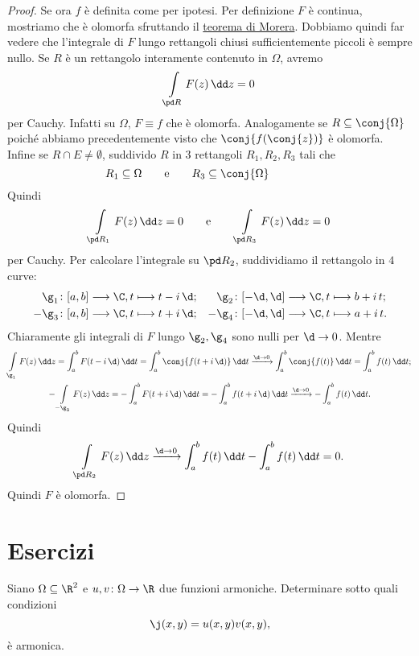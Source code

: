 \begin{proof}
	Se ora \(f\) è definita come per ipotesi. Per definizione \(F\) è continua, mostriamo che è olomorfa sfruttando il \hyperref[th:teoremaMorera]{teorema di Morera}. Dobbiamo quindi far vedere che l'integrale di \(F\) lungo rettangoli chiusi sufficientemente piccoli è sempre nullo.
	Se \(R\) è un rettangolo interamente contenuto in \(\Omega\), avremo
	\[
		\int\limits_{\pd R}F(z)\,\dd z = 0
	\]
	per Cauchy. Infatti su \(\Omega\), \(F\equiv f\) che è olomorfa.
	Analogamente se \(R\subseteq\conj{\Omega}\) poiché abbiamo precedentemente visto che \(\conj{f(\conj{z})}\) è olomorfa.
	Infine se \(R\cap E\neq \emptyset\), suddivido \(R\) in \(3\) rettangoli \(R_1,R_2,R_3\) tali che
	\[
		R_1 \subseteq \Omega \qquad\text{e}\qquad R_3 \subseteq \conj{\Omega} \qquad\qquad 
	\]
	Quindi
	\[
		\int\limits_{\pd R_1}F(z)\,\dd z = 0 \qquad\text{e}\qquad \int\limits_{\pd R_3}F(z)\,\dd z = 0
	\]
	per Cauchy. Per calcolare l'integrale su \(\pd R_2\), suddividiamo il rettangolo in \(4\) curve:
	\begin{align*}
		\g_1\colon [a,b] \longrightarrow \C  & , t\longmapsto t-i\,\d; & \g_2\colon [-\d,\d] \longrightarrow \C  & , t\longmapsto b+i\,t;  \\
		-\g_3\colon [a,b] \longrightarrow \C & , t\longmapsto t+i\,\d; & -\g_4\colon [-\d,\d] \longrightarrow \C & , t\longmapsto a+i\,t.
	\end{align*}
	Chiaramente gli integrali di \(F\) lungo \(\g_2,\g_4\) sono nulli per \(\d \to 0\). Mentre
	\begin{gather*}
		\int\limits_{\g_1}F(z)\,\dd z = \int_a^b F(t-i\,\d)\,\dd t = \int_a^b \conj{f(t+i\,\d)}\,\dd t \xrightarrow{\d \to 0} \int_a^b \conj{f(t)}\,\dd t = \int_a^b f(t)\,\dd t;\\
		-\int\limits_{-\g_3}F(z)\,\dd z = -\int_a^b F(t+i\,\d)\,\dd t = -\int_a^b f(t+i\,\d)\,\dd t \xrightarrow{\d \to 0} -\int_a^b f(t)\,\dd t.
	\end{gather*}
	Quindi
	\[
		\int\limits_{\pd R_2}F(z)\,\dd z \xrightarrow{\d \to 0} \int_a^b f(t)\,\dd t - \int_a^b f(t)\,\dd t = 0.
	\]
	Quindi \(F\) è olomorfa.
\end{proof}
%
%
\section{Esercizi}

\begin{exeN}
	Siano \(\Omega\subseteq \R^2\) e \(u,v\colon \Omega \to \R\) due funzioni armoniche.
	Determinare sotto quali condizioni
	\[
		\j(x,y) = u(x,y)v(x,y),
	\]
	è armonica.
\end{exeN}

